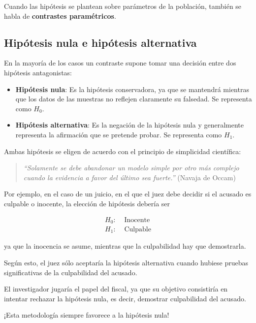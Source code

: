 \documentclass[
  a4paper,
]{scrreport}
\theoremstyle{definition}
\theoremstyle{definition}
\theoremstyle{plain}
\theoremstyle{remark}
\begin{document}
Cuando las hipótesis se plantean sobre parámetros de la población,
también se habla de \textbf{contrastes paramétricos}.

\hypertarget{hipuxf3tesis-nula-e-hipuxf3tesis-alternativa}{%
\subsection{Hipótesis nula e hipótesis
alternativa}\label{hipuxf3tesis-nula-e-hipuxf3tesis-alternativa}}

En la mayoría de los casos un contraste supone tomar una decisión entre
dos hipótesis antagonistas:

\begin{itemize}
\item
  \textbf{Hipótesis nula}: Es la hipótesis conservadora, ya que se
  mantendrá mientras que los datos de las muestras no reflejen
  claramente su falsedad. Se representa como \(H_0\).
\item
  \textbf{Hipótesis alternativa}: Es la negación de la hipótesis nula y
  generalmente representa la afirmación que se pretende probar. Se
  representa como \(H_1\).
\end{itemize}

Ambas hipótesis se eligen de acuerdo con el principio de simplicidad
científica:

\begin{quote}
\emph{``Solamente se debe abandonar un modelo simple por otro más
complejo cuando la evidencia a favor del último sea fuerte.''} (Navaja
de Occam)
\end{quote}

Por ejemplo, en el caso de un juicio, en el que el juez debe decidir si
el acusado es culpable o inocente, la elección de hipótesis debería ser

\begin{align*}
H_0: & \mbox{ Inocente} \\
H_1: & \mbox{ Culpable}
\end{align*}

ya que la inocencia se asume, mientras que la culpabilidad hay que
demostrarla.

Según esto, el juez sólo aceptaría la hipótesis alternativa cuando
hubiese pruebas significativas de la culpabilidad del acusado.

El investigador jugaría el papel del fiscal, ya que su objetivo
consistiría en intentar rechazar la hipótesis nula, es decir, demostrar
culpabilidad del acusado.

\begin{tcolorbox}[enhanced jigsaw, colbacktitle=quarto-callout-warning-color!10!white, toptitle=1mm, colback=white, toprule=.15mm, bottomrule=.15mm, rightrule=.15mm, left=2mm, colframe=quarto-callout-warning-color-frame, coltitle=black, bottomtitle=1mm, arc=.35mm, titlerule=0mm, title=\textcolor{quarto-callout-warning-color}{\faExclamationTriangle}\hspace{0.5em}{Advertencia}, breakable, opacitybacktitle=0.6, leftrule=.75mm, opacityback=0]

¡Esta metodología siempre favorece a la hipótesis nula!

\end{tcolorbox}
\end{document}
